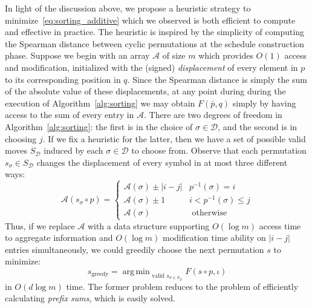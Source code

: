 \documentclass[sn-mathphys]{sn-jnl}
\DeclareMathOperator*{\argmin}{arg\,min}
\begin{document}
In light of the discussion above, we propose a heuristic strategy to minimize~\eqref{eq:sorting_additive} which we observed is both efficient to compute and effective in practice.
The heuristic is inspired by the simplicity of computing the Spearman distance between cyclic permutations at the schedule construction phase. Suppose we begin with an array $\mathcal{A}$ of size $m$ which provides $O(1)$ access and modification, initialized with the (signed) \emph{displacement} of every element in $p$ to its corresponding position in $q$. Since the Spearman distance is simply the sum of the absolute value of these displacements, at any point during during the execution of Algorithm~\ref{alg:sorting} we may obtain $F(\bar{p}, q)$ simply by having access to the sum of every entry in $\mathcal{A}$. There are two degrees of freedom in   Algorithm~\ref{alg:sorting}: the first is in the choice of $\sigma \in \mathcal{D}$, and the second is in choosing $j$. If we fix a heuristic for the latter, then we have a set of possible valid moves $S_\mathcal{D}$ induced by each $\sigma \in \mathcal{D}$ to choose from. Observe that each permutation $s_\sigma \in S_\mathcal{D}$ changes the displacement of every symbol in at most three different ways: 
\[
\mathcal{A}(s_\sigma \circ p) = 
\begin{cases} 
	 \mathcal{A}(\sigma) \pm \lvert i - j \rvert & p^{-1}(\sigma) = i \\
	 \mathcal{A}(\sigma) \pm 1 & i < p^{-1}(\sigma) \leq j \\
	 \mathcal{A}(\sigma) & \text{ otherwise }
\end{cases}
\]
Thus, if we replace $\mathcal{A}$ with a data structure  supporting $O(\log m)$ access time to aggregate information and $O(\log m)$ modification time ability on $\lvert i - j \vert$ entries simultaneously, we could greedily choose the next permutation $s$ to minimize:
\begin{equation}\label{eq:greedy_step}
	s_{\text{greedy}} = \argmin_{\text{ valid } s_{\sigma \in S_{\mathcal{D}}}} F(s\circ p, \iota)
\end{equation}  
in $O(d\log m)$ time. 
The former problem reduces to the problem of efficiently calculating \emph{prefix sums}, which is easily solved. 
\end{document}
